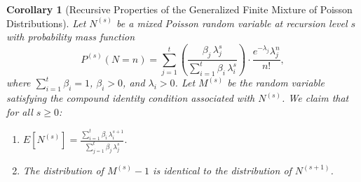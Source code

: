 \documentclass[11pt]{amsart}
\theoremstyle{definition}
\theoremstyle{plain}
\newtheorem{corollary}{Corollary}
\begin{document}
\begin{corollary}[Recursive Properties of the Generalized Finite Mixture of Poisson
Distributions]\label{cor:poisson-gen}
Let $N^{(s)}$ be a mixed Poisson random variable at recursion level $s$ with probability
mass function
\[
    P^{(s)}(N = n)
    = \sum_{j=1}^{t}
      \left(\frac{\beta_j\,\lambda_j^s}{\sum_{i=1}^{t}\beta_i\,\lambda_i^s}\right)
      \cdot \frac{e^{-\lambda_j}\lambda_j^n}{n!},
\]
where $\sum_{i=1}^{t}\beta_i = 1$, $\beta_i > 0$, and $\lambda_i > 0$.  Let $M^{(s)}$ be
the random variable satisfying the compound identity condition associated with $N^{(s)}$.
We claim that for all $s \geq 0$:
\begin{enumerate}
\item $\displaystyle E[N^{(s)}]
      = \frac{\sum_{i=1}^{t}\beta_i\,\lambda_i^{s+1}}
             {\sum_{j=1}^{t}\beta_j\,\lambda_j^s}.$
\item The distribution of $M^{(s)} - 1$ is identical to the distribution of $N^{(s+1)}$.
\end{enumerate}
\end{corollary}
\end{document}
